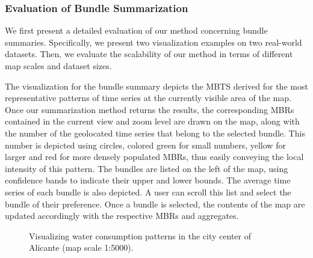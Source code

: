 \subsubsection{Evaluation of Bundle Summarization}
\label{subsec:bundle_sum}

We first present a detailed evaluation of our method concerning bundle summaries. Specifically, we present two visualization examples on two real-world datasets. Then, we evaluate the scalability of our method in terms of different map scales and dataset sizes.

\label{subsubsec:bundle_sum_vis}

The visualization for the bundle summary depicts the MBTS derived for the most representative patterns of time series at the currently visible area of the map. Once our summarization method returns the results, the corresponding MBRs contained in the current view and zoom level are drawn on the map, along with the number of the geolocated time series that belong to the selected bundle. This number is depicted using circles, colored green for small numbers, yellow for larger and red for more densely populated MBRs, thus easily conveying the local intensity of this pattern. The bundles are listed on the left of the map, using confidence bands to indicate their upper and lower bounds. The average time series of each bundle is also depicted. A user can scroll this list and select the bundle of their preference. Once a bundle is selected, the contents of the map are updated accordingly with the respective MBRs and aggregates.

\begin{figure}[ht]
 \centering
 \caption{Visualizing water consumption patterns in the city center of Alicante (map scale 1:5000).}
 \vspace{-7.5pt}
 \label{fig:alicante_example}
\end{figure}

